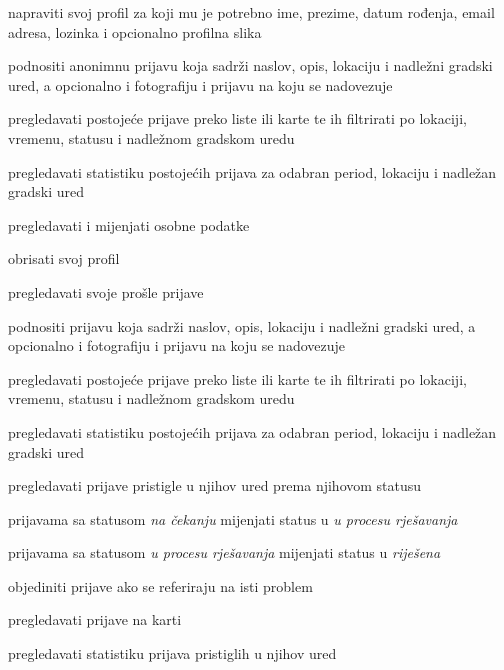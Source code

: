 			\begin{packed_enum}
				
				\item  {}
				\begin{packed_enum}
					\item napraviti svoj profil za koji mu je potrebno ime, prezime, datum rođenja, email adresa, lozinka i opcionalno profilna slika
					\item podnositi anonimnu prijavu koja sadrži naslov, opis, lokaciju i nadležni gradski ured, a opcionalno i fotografiju i prijavu na koju se nadovezuje
					\item  pregledavati postojeće prijave preko liste ili karte te ih filtrirati po lokaciji, vremenu, statusu i nadležnom gradskom uredu
					\item pregledavati statistiku postojećih prijava za odabran period, lokaciju i nadležan gradski ured			
				\end{packed_enum}
								
				\item  {}				
				\begin{packed_enum}					
					\item pregledavati i mijenjati osobne podatke
					\item obrisati svoj profil
					\item pregledavati svoje prošle prijave
					\item podnositi prijavu koja sadrži naslov, opis, lokaciju i nadležni gradski ured, a opcionalno i fotografiju i prijavu na koju se nadovezuje
					\item  pregledavati postojeće prijave preko liste ili karte te ih filtrirati po lokaciji, vremenu, statusu i nadležnom gradskom uredu
					\item pregledavati statistiku postojećih prijava za odabran period, lokaciju i nadležan gradski ured
				\end{packed_enum}
				
				\item  {}
				\begin{packed_enum}
					\item pregledavati prijave pristigle u njihov ured prema njihovom statusu
					\item prijavama sa statusom \textit{na čekanju} mijenjati status u \textit{u procesu rješavanja}
					\item prijavama sa statusom \textit{u procesu rješavanja} mijenjati status u \textit{riješena}
					\item objediniti prijave ako se referiraju na isti problem
					\item pregledavati prijave na karti
					\item pregledavati statistiku prijava pristiglih u njihov ured
				\end{packed_enum}
				

\end{packed_enum}
